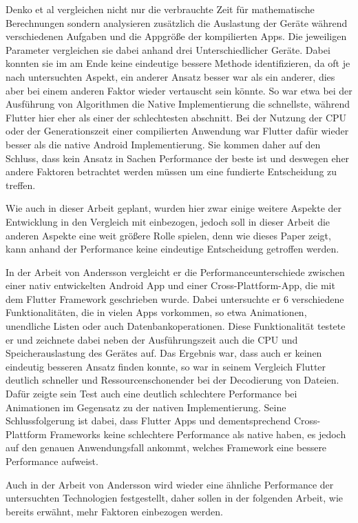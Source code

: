 Denko et al \cite{Denko_performance} vergleichen nicht nur die verbrauchte Zeit für mathematische Berechnungen sondern analysieren zusätzlich die Auslastung der Geräte während verschiedenen Aufgaben und die Appgröße der kompilierten Apps. Die jeweiligen Parameter vergleichen sie dabei anhand drei Unterschiedlicher Geräte. Dabei konnten sie im am Ende keine eindeutige bessere Methode identifizieren, da oft je nach untersuchten Aspekt, ein anderer Ansatz besser war als ein anderer, dies aber bei einem anderen Faktor wieder vertauscht sein könnte. So war etwa bei der Ausführung von Algorithmen die Native Implementierung die schnellste, während Flutter hier eher als einer der schlechtesten abschnitt. Bei der Nutzung der CPU oder der Generationszeit einer compilierten Anwendung war Flutter dafür wieder besser als die native Android Implementierung. Sie kommen daher auf den Schluss, dass kein Ansatz in Sachen Performance der beste ist und deswegen eher andere Faktoren betrachtet werden müssen um eine fundierte Entscheidung zu treffen.

Wie auch in dieser Arbeit geplant, wurden hier zwar einige weitere Aspekte der Entwicklung in den Vergleich mit einbezogen, jedoch soll in dieser Arbeit die anderen Aspekte eine weit größere Rolle spielen, denn wie dieses Paper zeigt, kann anhand der Performance keine eindeutige Entscheidung getroffen werden.

In der Arbeit von  Andersson \cite{Andersson_2022} vergleicht er die Performanceunterschiede zwischen einer nativ entwickelten Android App und einer Cross-Plattform-App, die mit dem Flutter Framework geschrieben wurde. Dabei untersuchte er 6 verschiedene Funktionalitäten, die in vielen Apps vorkommen, so etwa Animationen, unendliche Listen oder auch Datenbankoperationen. Diese Funktionalität testete er und zeichnete dabei neben der Ausführungszeit auch die CPU und Speicherauslastung des Gerätes auf. Das Ergebnis war, dass auch er keinen eindeutig besseren Ansatz finden konnte, so war in seinem Vergleich Flutter deutlich schneller und Ressourcenschonender bei der Decodierung von Dateien. Dafür zeigte sein Test auch eine deutlich schlechtere Performance bei Animationen im Gegensatz zu der nativen Implementierung. Seine Schlussfolgerung ist dabei, dass Flutter Apps und dementsprechend Cross-Plattform Frameworks keine schlechtere Performance als native haben, es jedoch auf den genauen Anwendungsfall ankommt, welches Framework eine bessere Performance aufweist.

Auch in der Arbeit von Andersson wird wieder eine ähnliche Performance der untersuchten Technologien festgestellt, daher sollen in der folgenden Arbeit, wie bereits erwähnt, mehr Faktoren einbezogen werden. 

